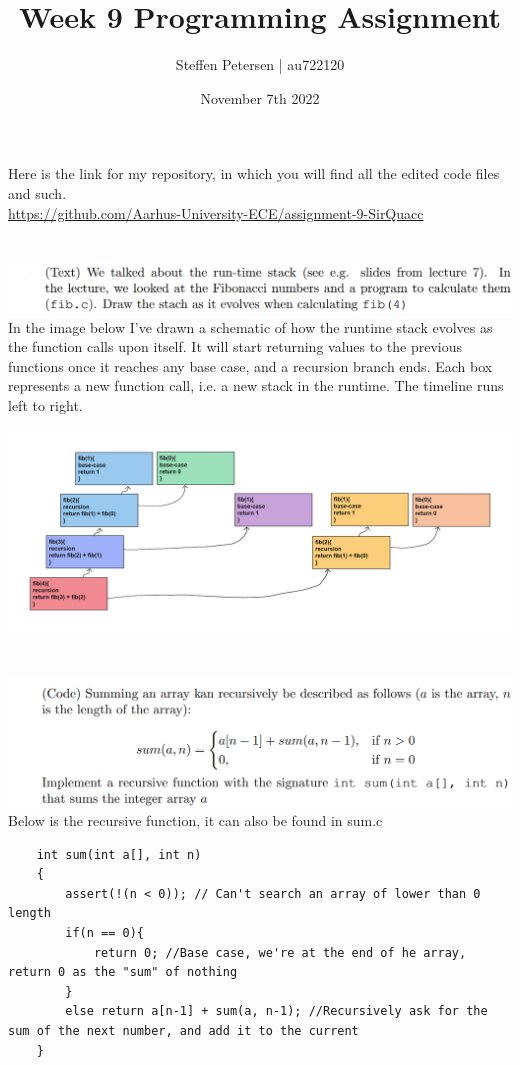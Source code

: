 \documentclass{article}
\title{Week 9 Programming Assignment}
\author{Steffen Petersen | au722120}
\date{November 7th 2022}
\begin{document}

\maketitle
\vspace{5pt}
\noindent Here is the link for my repository, in which you will find all the edited code files and such.\\
\url{https://github.com/Aarhus-University-ECE/assignment-9-SirQuacc}
\section{}
\includegraphics[width=\linewidth, keepaspectratio=true]{task1}
\vspace{2pt}\\
In the image below I've drawn a schematic of how the runtime stack evolves as the function calls upon itself. It will start returning
values to the previous functions once it reaches any base case, and a recursion branch ends. Each box
represents a new function call, i.e. a new stack in the runtime.
The timeline runs left to right.

\begin{center}
    \includegraphics[width=0.95\linewidth, keepaspectratio=true]{runtimestack}
\end{center}

\pagebreak
\section{}
\includegraphics[width=\linewidth, keepaspectratio=true]{task2}
\vspace{2pt}
Below is the recursive function, it can also be found in sum.c
\begin{lstlisting}
    int sum(int a[], int n)
    {
        assert(!(n < 0)); // Can't search an array of lower than 0 length
        if(n == 0){
            return 0; //Base case, we're at the end of he array, return 0 as the "sum" of nothing
        }
        else return a[n-1] + sum(a, n-1); //Recursively ask for the sum of the next number, and add it to the current
    }
\end{lstlisting}
\end{document}
